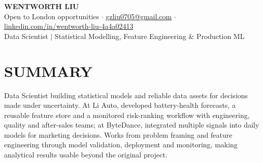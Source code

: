 \documentclass[a4paper,10pt]{article}
\begin{document}
\fontsize{9.8pt}{11.2pt}\selectfont

\begin{center}
{\Large\bfseries WENTWORTH LIU}\\[2pt]
{\small Open to London opportunities \;$\cdot$\; \href{mailto:gzliu0705@gmail.com}{gzliu0705@gmail.com} \;$\cdot$\; \href{https://www.linkedin.com/in/wentworth-liu-4a4a02413}{linkedin.com/in/wentworth-liu-4a4a02413}}\\[2pt]
 {\small Data Scientist \;$\vert$\; Statistical Modelling, Feature Engineering \& Production ML}
\end{center}
\vspace{-4pt}

\section{SUMMARY}
Data Scientist building statistical models and reliable data assets for decisions made under uncertainty. At Li Auto, developed battery-health forecasts, a reusable feature store and a monitored risk-ranking workflow with engineering, quality and after-sales teams; at ByteDance, integrated multiple signals into daily models for marketing decisions. Works from problem framing and feature engineering through model validation, deployment and monitoring, making analytical results usable beyond the original project.
\end{document}
